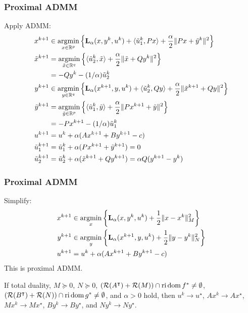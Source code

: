 \documentclass[10pt,mathserif]{beamer}
\begin{document}
\begin{frame}
\frametitle{Proximal ADMM}
Apply ADMM:
\begin{align*}
x^{k+1}&\in
 \operatorname*{argmin}_{x\in\mathbb{R}^p} \left\{
 \mathbf{L}_\alpha (x,y^k, u ^k)
 +\langle \tilde{ u }^{k}_1,
 Px
 \rangle
 +
 \frac{\alpha}{2}\|Px+\tilde{y}^k\|^2\right\}
 \\
\tilde{x}^{k+1}&=
 \operatorname*{argmin}_{\tilde{x}\in\mathbb{R}^q} \left\{
 \langle \tilde{ u }^k_2,
 \tilde{x}\rangle+
 \frac{\alpha}{2}\|
 \tilde{x}+Qy^k
 \|^2
 \right\}
 \\
 &=
 -Qy^k-(1/\alpha)\tilde{ u }_2^k
 \\
 y^{k+1}&\in
 \operatorname*{argmin}_{y\in\mathbb{R}^q} \left\{\mathbf{L}_\alpha(x^{k+1},y, u ^k)
 +\langle \tilde{ u }^k_2,Qy\rangle
 +\frac{\alpha}{2}\|\tilde{x}^{k+1}+Qy\|^2
 \right\}
 \\
 \tilde{y}^{k+1}&=
 \operatorname*{argmin}_{\tilde{y}\in\mathbb{R}^p} \left\{
 \langle \tilde{ u }^k_1,
 \tilde{y}\rangle
 +\frac{\alpha}{2}\|Px^{k+1}+\tilde{y}\|^2
 \right\}\\
 &=-Px^{k+1}-(1/\alpha)\tilde{ u }^k_1
 \\
 u ^{k+1}&= u ^k+\alpha(Ax^{k+1}+By^{k+1}-c)\\
\tilde{ u }_1^{k+1}&=\tilde{ u }_1^{k}+\alpha(Px^{k+1}+\tilde{y}^{k+1})=0\\
\tilde{ u }_2^{k+1}&=\tilde{ u }_2^{k}+\alpha(\tilde{x}^{k+1}+Qy^{k+1})
=\alpha Q(y^{k+1}-y^k)
\end{align*}
\end{frame}

\begin{frame}
\frametitle{Proximal ADMM}
Simplify:
\begin{align*}
x^{k+1}&\in
 \operatorname*{argmin}_{x} \left\{
 \mathbf{L}_\alpha (x,y^k, u ^k)
 +
 \frac{1}{2}\|x-x^k\|^2_M\right\}
 \\
 y^{k+1}&\in
 \operatorname*{argmin}_{y} \left\{\mathbf{L}_\alpha(x^{k+1},y, u ^k)
 +\frac{1}{2}\|y-y^k\|^2_N
 \right\}
  \\
 u ^{k+1}&= u ^k+\alpha(Ax^{k+1}+By^{k+1}-c)
\end{align*}
This is proximal ADMM.

\vspace{0.2in}
If total duality, $M\succeq 0$,  $N\succeq 0$, $({\mathcal{R}}(A^\intercal)+{\mathcal{R}}(M))\cap \mathrm{ri}\,\mathrm{dom}\, f^*\ne \emptyset$, $({\mathcal{R}}(B^\intercal)+{\mathcal{R}}(N))\cap \mathrm{ri}\,\mathrm{dom}\, g^*\ne \emptyset$, and $\alpha>0$ hold,
then $ u ^k\rightarrow  u ^\star$,
$Ax^{k}\rightarrow Ax^\star$,
$Mx^{k}\rightarrow Mx^\star$,
$By^{k}\rightarrow By^\star$, and
$Ny^{k}\rightarrow Ny^\star$.

\end{frame}
\end{document}
